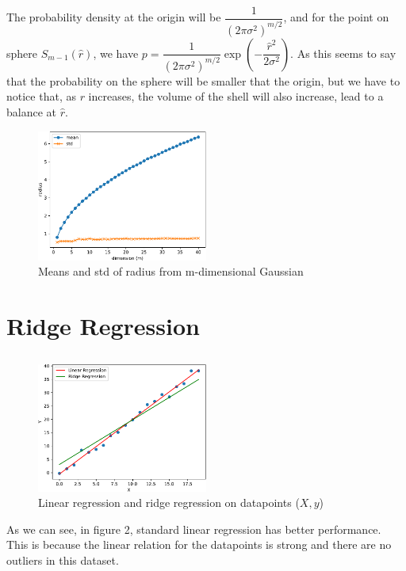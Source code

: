 \documentclass{article}
\begin{document}
\subsection{}
The probability density at the origin will be $ \dfrac{1}{(2\pi \sigma ^2)^ {m/2}} $, and for the point on sphere $ S_{m-1}(\hat r) $, we have $ p = \dfrac{1}{(2\pi \sigma ^2)^ {m/2}} \exp{\left(-\dfrac{\hat r^2}{2\sigma ^2}\right)} $. As this seems to say that the probability on the sphere will be smaller that the origin, but we have to notice that, as $ r $ increases, the volume of the shell will also increase, lead to a balance at $ \hat r $.
\begin{figure}[htbp]
    \begin{center}
        \includegraphics[width=0.5\textwidth]{./figure/mean_std_radius.pdf}
    \end{center}
    \caption{Means and std of radius from m-dimensional Gaussian}\label{fig:}
\end{figure}
\clearpage
\section{Ridge Regression}
\subsection{}
\begin{figure}[htbp]
    \begin{center}
        \includegraphics[width=0.5\textwidth]{./figure/ridge_regression.pdf}
    \end{center}
    \caption{Linear regression and ridge regression on datapoints ($ X, y $)}\label{fig:}
\end{figure}
As we can see, in figure 2, standard linear regression has better performance. This is because the linear relation for the datapoints is strong and there are no outliers in this dataset.
\end{document}
